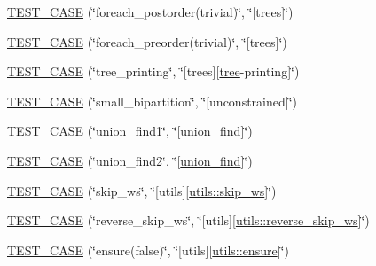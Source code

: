 \begin{DoxyCompactItemize}
\item 
\hyperlink{namespaceterraces_1_1tests_ab5aa0946216cda3df7e889f62268f5c3}{T\+E\+S\+T\+\_\+\+C\+A\+SE} (\char`\"{}foreach\+\_\+postorder(trivial)\char`\"{}, \char`\"{}\mbox{[}trees\mbox{]}\char`\"{})
\item 
\hyperlink{namespaceterraces_1_1tests_af4ac7f65fe3e901f85a7ac11a37c6a68}{T\+E\+S\+T\+\_\+\+C\+A\+SE} (\char`\"{}foreach\+\_\+preorder(trivial)\char`\"{}, \char`\"{}\mbox{[}trees\mbox{]}\char`\"{})
\item 
\hyperlink{namespaceterraces_1_1tests_ae984c4d76090aa1cb91a82b0512afa7b}{T\+E\+S\+T\+\_\+\+C\+A\+SE} (\char`\"{}tree\+\_\+printing\char`\"{}, \char`\"{}\mbox{[}trees\mbox{]}\mbox{[}\hyperlink{namespaceterraces_a07aaf7feec4a22c6cdefc14c5a81bdd0}{tree}-\/printing\mbox{]}\char`\"{})
\item 
\hyperlink{namespaceterraces_1_1tests_a060b457d6e88fffe25ff07d94fe1bcc9}{T\+E\+S\+T\+\_\+\+C\+A\+SE} (\char`\"{}small\+\_\+bipartition\char`\"{}, \char`\"{}\mbox{[}unconstrained\mbox{]}\char`\"{})
\item 
\hyperlink{namespaceterraces_1_1tests_ada8358f0d818651ea95793c618160929}{T\+E\+S\+T\+\_\+\+C\+A\+SE} (\char`\"{}union\+\_\+find1\char`\"{}, \char`\"{}\mbox{[}\hyperlink{classterraces_1_1union__find}{union\+\_\+find}\mbox{]}\char`\"{})
\item 
\hyperlink{namespaceterraces_1_1tests_abfe0b2ce4d3528b62cd00f2b5253342d}{T\+E\+S\+T\+\_\+\+C\+A\+SE} (\char`\"{}union\+\_\+find2\char`\"{}, \char`\"{}\mbox{[}\hyperlink{classterraces_1_1union__find}{union\+\_\+find}\mbox{]}\char`\"{})
\item 
\hyperlink{namespaceterraces_1_1tests_a672d9af12d843f5eac907152c5ea82a8}{T\+E\+S\+T\+\_\+\+C\+A\+SE} (\char`\"{}skip\+\_\+ws\char`\"{}, \char`\"{}\mbox{[}utils\mbox{]}\mbox{[}\hyperlink{namespaceterraces_1_1utils_a72c9d3a03a496794590f5c9d7a01aa58}{utils\+::skip\+\_\+ws}\mbox{]}\char`\"{})
\item 
\hyperlink{namespaceterraces_1_1tests_ab012cf9d00e9995b00c29c3268367922}{T\+E\+S\+T\+\_\+\+C\+A\+SE} (\char`\"{}reverse\+\_\+skip\+\_\+ws\char`\"{}, \char`\"{}\mbox{[}utils\mbox{]}\mbox{[}\hyperlink{namespaceterraces_1_1utils_a8f537b0f3154a2a1c21650098e16797e}{utils\+::reverse\+\_\+skip\+\_\+ws}\mbox{]}\char`\"{})
\item 
\hyperlink{namespaceterraces_1_1tests_a16871530c0b1bef9b930d6f6d60f6bcf}{T\+E\+S\+T\+\_\+\+C\+A\+SE} (\char`\"{}ensure(false)\char`\"{}, \char`\"{}\mbox{[}utils\mbox{]}\mbox{[}\hyperlink{namespaceterraces_1_1utils_aae29deaf7ae1e950beddb248d2591ce2}{utils\+::ensure}\mbox{]}\char`\"{})

\end{DoxyCompactItemize}

